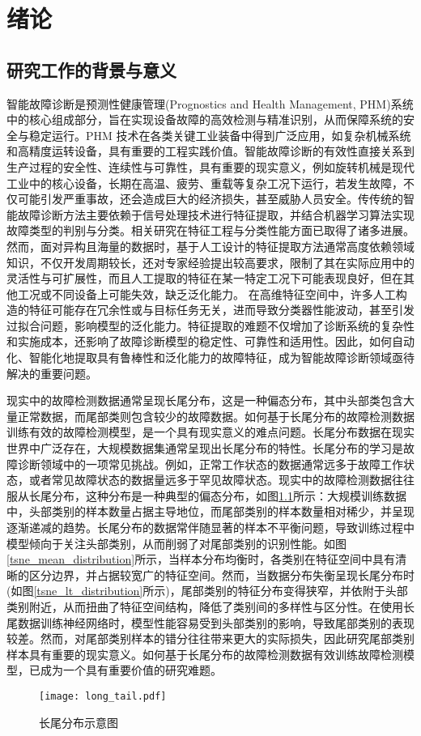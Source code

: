 \documentclass[master]{thesis-uestc}
\begin{document}
\thesistableofcontents

\chapter{绪\hspace{6pt}论}

\section{研究工作的背景与意义}
智能故障诊断是预测性健康管理(Prognostics and Health Management, PHM)系统中的核心组成部分，旨在实现设备故障的高效检测与精准识别，从而保障系统的安全与稳定运行。PHM 技术在各类关键工业装备中得到广泛应用，如复杂机械系统和高精度运转设备，具有重要的工程实践价值。智能故障诊断的有效性直接关系到生产过程的安全性、连续性与可靠性，具有重要的现实意义，例如旋转机械是现代工业中的核心设备，长期在高温、疲劳、重载等复杂工况下运行，若发生故障，不仅可能引发严重事故，还会造成巨大的经济损失，甚至威胁人员安全。传传统的智能故障诊断方法主要依赖于信号处理技术进行特征提取，并结合机器学习算法实现故障类型的判别与分类。相关研究在特征工程与分类性能方面已取得了诸多进展。然而，面对异构且海量的数据时，基于人工设计的特征提取方法通常高度依赖领域知识，不仅开发周期较长，还对专家经验提出较高要求，限制了其在实际应用中的灵活性与可扩展性，而且人工提取的特征在某一特定工况下可能表现良好，但在其他工况或不同设备上可能失效，缺乏泛化能力。
在高维特征空间中，许多人工构造的特征可能存在冗余性或与目标任务无关，进而导致分类器性能波动，甚至引发过拟合问题，影响模型的泛化能力。特征提取的难题不仅增加了诊断系统的复杂性和实施成本，还影响了故障诊断模型的稳定性、可靠性和适用性。因此，如何自动化、智能化地提取具有鲁棒性和泛化能力的故障特征，成为智能故障诊断领域亟待解决的重要问题。

现实中的故障检测数据通常呈现长尾分布，这是一种偏态分布，其中头部类包含大量正常数据，而尾部类则包含较少的故障数据。如何基于长尾分布的故障检测数据训练有效的故障检测模型，是一个具有现实意义的难点问题。长尾分布数据在现实世界中广泛存在，大规模数据集通常呈现出长尾分布的特性。长尾分布的学习是故障诊断领域中的一项常见挑战。例如，正常工作状态的数据通常远多于故障工作状态，或者常见故障状态的数据量远多于罕见故障状态。现实中的故障检测数据往往服从长尾分布，这种分布是一种典型的偏态分布，如图\ref{fig_long_tail}所示：大规模训练数据中，头部类别的样本数量占据主导地位，而尾部类别的样本数量相对稀少，并呈现逐渐递减的趋势。长尾分布的数据常伴随显著的样本不平衡问题，导致训练过程中模型倾向于关注头部类别，从而削弱了对尾部类别的识别性能。如图\ref{tsne_mean_distribution}所示，当样本分布均衡时，各类别在特征空间中具有清晰的区分边界，并占据较宽广的特征空间。然而，当数据分布失衡呈现长尾分布时(如图\ref{tsne_lt_distribution}所示)，尾部类别的特征分布变得狭窄，并依附于头部类别附近，从而扭曲了特征空间结构，降低了类别间的多样性与区分性。在使用长尾数据训练神经网络时，模型性能容易受到头部类别的影响，导致尾部类别的表现较差。然而，对尾部类别样本的错分往往带来更大的实际损失，因此研究尾部类别样本具有重要的现实意义。如何基于长尾分布的故障检测数据有效训练故障检测模型，已成为一个具有重要价值的研究难题。
\begin{figure}[h]
    \texttt{[image: long\_tail.pdf]}
    \caption{长尾分布示意图}
    \label{fig_long_tail}
\end{figure}
\end{document}
